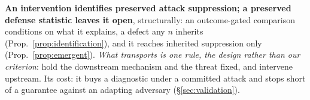\documentclass{article}
\begin{document}
\textbf{An intervention identifies preserved attack suppression; a preserved defense statistic leaves it open}, structurally: an outcome-gated comparison conditions on what it explains, a defect any $n$ inherits (Prop.~\ref{prop:identification}), and it reaches inherited suppression only (Prop.~\ref{prop:emergent}). \emph{What transports is one rule, the design rather than our criterion}: hold the downstream mechanism and the threat fixed, and intervene upstream. Its cost: it buys a diagnostic under a committed attack and stops short of a guarantee against an adapting adversary (§\ref{sec:validation}).
\end{document}
